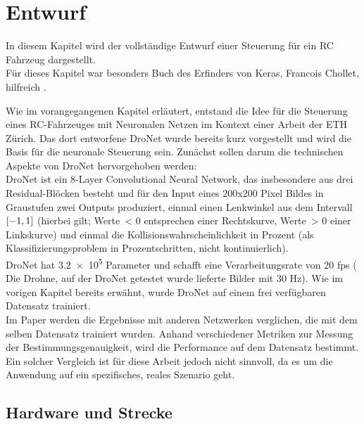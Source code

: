 %
\chapter{Entwurf}
In diesem Kapitel wird der vollständige Entwurf einer Steuerung für ein RC Fahrzeug dargestellt.\\
Für dieses Kapitel war besonders Buch des Erfinders von Keras, Francois Chollet, hilfreich \cite{chollet2018deep}.

Wie im vorangegangenen Kapitel erläutert, entstand die Idee für die Steuerung eines RC-Fahrzeuges mit Neuronalen Netzen im Kontext einer Arbeit der ETH Zürich.
Das dort entworfene DroNet wurde bereits kurz vorgestellt und wird die Basis für die neuronale Steuerung sein. Zunächst sollen darum die technischen Aspekte von DroNet hervorgehoben werden: \\
DroNet ist ein 8-Layer Convolutional Neural Network, das insbesondere aus drei Residual-Blöcken besteht und für den Input eines 200x200 Pixel Bildes in Graustufen zwei Outputs produziert, einmal einen Lenkwinkel aus dem Intervall $\interval{-1}{1}$ (hierbei gilt; Werte~< 0 entsprechen einer Rechtskurve, Werte~> 0 einer Linkskurve)  und einmal die Kollisionswahrscheinlichkeit in Prozent (als Klassifizierungsproblem in Prozentschritten, nicht kontinuierlich).\\
DroNet hat \num{3.2e5} Parameter und schafft eine Verarbeitungsrate von 20 fps ( Die Drohne, auf der DroNet getestet wurde lieferte Bilder mit 30 Hz).
Wie im vorigen Kapitel bereits erwähnt, wurde DroNet auf einem frei verfügbaren Datensatz trainiert.\\
Im Paper werden die Ergebnisse mit anderen Netzwerken verglichen, die mit dem selben Datensatz trainiert wurden. Anhand verschiedener Metriken zur Messung der Bestimmungsgenauigkeit, wird die Performance auf dem Datensatz bestimmt. Ein solcher Vergleich ist für diese Arbeit jedoch nicht sinnvoll, da es um die Anwendung auf ein spezifisches, reales Szenario geht.
\newpage 

\section{Hardware und Strecke}
